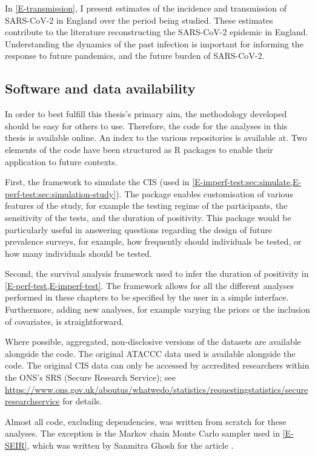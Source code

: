 \documentclass[thesis.tex]{subfiles}
\begin{document}
In \cref{E-transmission}, I present estimates of the incidence and transmission of SARS-CoV-2 in England over the period being studied.
These estimates contribute to the literature reconstructing the SARS-CoV-2 epidemic in England.
Understanding the dynamics of the past infection is important for informing the response to future pandemics, and the future burden of SARS-CoV-2.

\subsection{Software and data availability}

In order to best fulfill this thesis's primary aim, the methodology developed should be easy for others to use.
Therefore, the code for the analyses in this thesis is available online.
An index to the various repositories is available at.
Two elements of the code have been structured as R packages to enable their application to future contexts.

First, the framework to simulate the CIS (used in \cref{E-imperf-test:sec:simulate,E-perf-test:sec:simulation-study}).
The package enables customisation of various features of the study, for example the testing regime of the participants, the sensitivity of the tests, and the duration of positivity.
This package would be particularly useful in answering questions regarding the design of future prevalence surveys, for example, how frequently should individuals be tested, or how many individuals should be tested.

Second, the survival analysis framework used to infer the duration of positivity in \cref{E-perf-test,E-imperf-test}.
The framework allows for all the different analyses performed in these chapters to be specified by the user in a simple interface.
Furthermore, adding new analyses, for example varying the priors or the inclusion of covariates, is straightforward.

Where possible, aggregated, non-disclosive versions of the datasets are available alongside the code.
The original ATACCC data used is available alongside the code.
The original CIS data can only be accessed by accredited researchers within the ONS's SRS (Secure Research Service); see \url{https://www.ons.gov.uk/aboutus/whatwedo/statistics/requestingstatistics/secureresearchservice} for details.

Almost all code, excluding dependencies, was written from scratch for these analyses.
The exception is the Markov chain Monte Carlo sampler used in \cref{E-SEIR}, which was written by Sanmitra Ghosh for the article \textcite{ghoshApproximate}.
\end{document}
